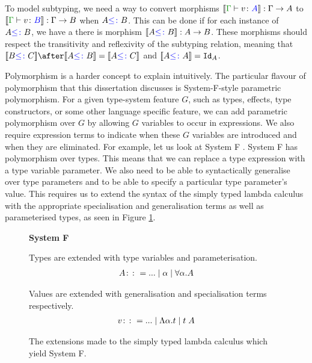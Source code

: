 To model subtyping, we need a way to convert morphisms $\deno{\gtyperelation{v}{A}}: \G\rightarrow A$ to $\deno{\gtyperelation{v}{B}}:\G\rightarrow B$ when $A{\color{blue} \leq\colon} B$. This can be done if for each instance of $A{\color{blue} \leq\colon} B$, we have a there is morphism ${\bf [\![}A{\color{blue} \leq\colon} B{\bf ]\!]}: A \rightarrow B$. These morphisms should respect the transitivity and reflexivity of the subtyping relation, meaning that $\deno{B\subtype C}\after\deno{A\subtype B} = \deno{A\subtype C}$ and ${\bf [\![}A{\color{blue} \leq\colon} A{\bf ]\!]} = \texttt{Id}_{A}$.

Polymorphism is a harder concept to explain intuitively. The particular flavour of polymorphism that this dissertation discusses is System-F-style parametric polymorphism. For a given type-system feature $G$, such as types, effects, type constructors, or some other language specific feature, we can add parametric polymorphism over $G$ by allowing $G$ variables to occur in expressions. We also require expression terms to indicate when these $G$ variables are introduced and when they are eliminated. For example, let us look at System F \cite{SystemFIntroduction}. System F has polymorphism over types. This means that we can replace a type expression with a type variable parameter. We also need to be able to syntactically generalise over type parameters and to be able to specify a particular type parameter's value. This requires us to extend the syntax of the simply typed lambda calculus with the appropriate specialisation and generalisation terms as well as parameterised types, as seen in Figure \ref{SystemFTermsTypes}.

\begin{figure}
    \begin{framed}
        \centering
        \textbf{System F}

        Types are extended with type variables and parameterisation.
        \begin{align*}
            A \colon\colon= ... \mid \alpha\mid \forall \alpha. A
        \end{align*}

        Values are extended with generalisation and specialisation terms respectively.
        \begin{align*}
            v \colon\colon= ... \mid \Lambda \alpha. t\mid t\; A
        \end{align*}
    \end{framed}
    \caption{The extensions made to the simply typed lambda calculus which yield System F.}
    \label{SystemFTermsTypes}
\end{figure}

